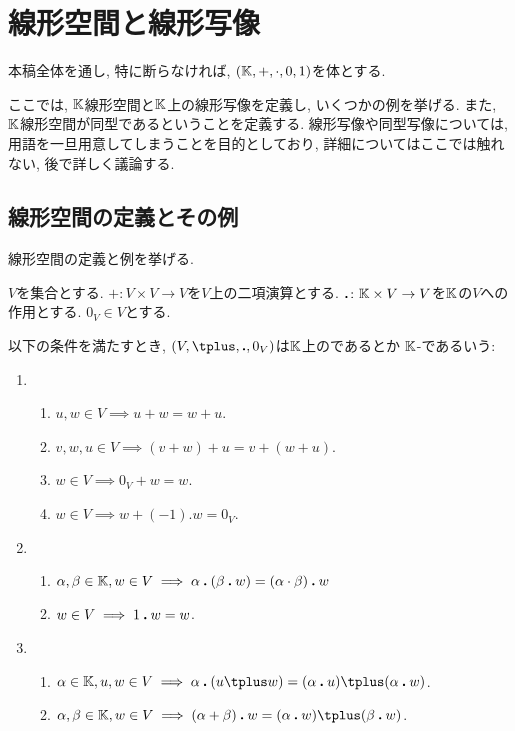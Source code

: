 \chapter{線形空間と線形写像}
\label{chap:linspace:linmap}
本稿全体を通し,
特に断らなければ,
$(\mathbb{K},+,\cdot,0,1)$を体とする.

ここでは, $\mathbb{K}$線形空間と$\mathbb{K}$上の線形写像を定義し,
いくつかの例を挙げる.
また, $\mathbb{K}$線形空間が同型であるということを定義する.
線形写像や同型写像については,
用語を一旦用意してしまうことを目的としており,
詳細についてはここでは触れない,
後で詳しく議論する.

\section{線形空間の定義とその例}
\label{sec:linspace:def}

線形空間の定義と例を挙げる.

\begin{definition}
\label{def:vecsp}
  $V$を集合とする.
  $\plus\colon V\times V \to V$を$V$上の二項演算とする.
  $\mathbin{\boldsymbol{.}} \colon \mathbb{K}\times V \to V$を$\mathbb{K}$の$V$への作用とする.
  $0_V \in V$とする.

  以下の条件を満たすとき,
  $(V,\plus,\act ,0_V)$は$\mathbb{K}$上のであるとか
  $\mathbb{K}$-であるいう:
  \begin{enumerate}
  \item 
    \begin{enumerate}
      \label{def:vecsp:item:com}
    \item $u,w \in V\implies  u\plus w=w\plus u$.
    \item
      \label{def:vecsp:item:sum:ass}
      $v,w,u\in V \implies (v\plus w)\plus u=v\plus (w\plus u)$.
    \item $w\in V \implies 0_V\plus w=w$.
    \item $w\in V\implies w\plus (-1).w=0_V$.%
    \end{enumerate}
  \item
    \begin{enumerate}
    \item
      \label{def:vecsp:item:prod:ass}
      $\alpha,\beta\in\mathbb{K}, w\in V \implies \alpha\mathbin{\boldsymbol{.}} (\beta \mathbin{\boldsymbol{.}} w)=(\alpha\cdot \beta)\mathbin{\boldsymbol{.}} w$
    \item $w\in V \implies 1\mathbin{\boldsymbol{.}} w=w$.
    \end{enumerate}
  \item
    \begin{enumerate}
    \item
      \label{def:vecsp:item:dist:r}
$\alpha\in \KK,u,w\in V \implies \alpha\act (u\plus w)=(\alpha\act u)\plus (\alpha\act w)$.
    \item
      \label{def:vecsp:item:dist:l}
$\alpha,\beta\in\KK, w\in V\implies (\alpha+\beta)\act w=(\alpha\act w)\plus (\beta\act w)$.
    \end{enumerate}
  \end{enumerate}
\end{definition}

